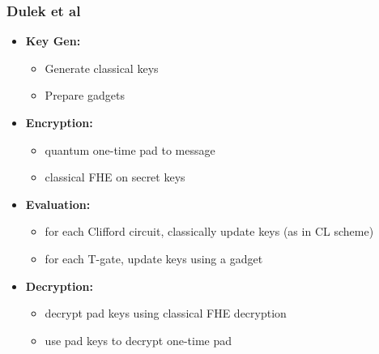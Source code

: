 \begin{frame}
 \frametitle{Dulek et al}
 \begin{itemize}
   \item \textbf{Key Gen:} 
   \begin{itemize}
     \item Generate classical keys
     \item Prepare gadgets
   \end{itemize}
   \item \textbf{Encryption:} 
   \begin{itemize}
     \item quantum one-time pad to message
     \item classical FHE on secret keys
   \end{itemize}
   \item \textbf{Evaluation:}
    \begin{itemize}
     \item for each Clifford circuit, classically update keys (as in CL scheme)
     \item for each T-gate, update keys using a gadget
   \end{itemize}
   \item \textbf{Decryption:}
   \begin{itemize}
     \item decrypt pad keys using classical FHE decryption
     \item use pad keys to decrypt one-time pad
    \end{itemize}
 \end{itemize}
 \end{frame}
